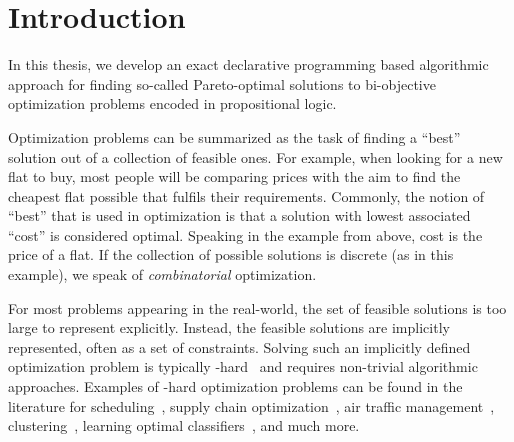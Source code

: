 \chapter{Introduction\label{chap:intro}}

In this thesis, we develop an exact declarative programming based algorithmic approach for finding so-called Pareto-optimal solutions to bi-objective optimization problems encoded in propositional logic.

Optimization problems can be summarized as the task of finding a ``best'' solution out of a collection of feasible ones.
For example, when looking for a new flat to buy, most people will be comparing prices with the aim to find the cheapest flat possible that fulfils their requirements.
Commonly, the notion of ``best'' that is used in optimization is that a solution with lowest associated ``cost'' is considered optimal.
Speaking in the example from above, cost is the price of a flat.
If the collection of possible solutions is discrete (as in this example), we speak of \emph{combinatorial} optimization.

For most problems appearing in the real-world, the set of feasible solutions is too large to represent explicitly.
Instead, the feasible solutions are implicitly represented, often as a set of constraints.
Solving such an implicitly defined optimization problem is typically \NP-hard~\autocite{AroraBarak2009-complexity} and requires non-trivial algorithmic approaches.
Examples of \NP-hard optimization problems can be found in the literature for scheduling~\autocites{DBLP:conf/cp/Stojadinovic14,DBLP:conf/cpaior/BofillGSV15,DBLP:journals/ior/Solomon87,DBLP:journals/candie/AkyolB07}, supply chain optimization~\autocite{DBLP:journals/cce/Papageorgiou09}, air traffic management~\autocites{DBLP:journals/ior/BertsimasLO11,RichardsHow2002Aircrafttrajectoryplanning}, clustering~\autocite{DBLP:journals/ai/DaoDV17,DBLP:conf/sdm/DavidsonRS10}, learning optimal classifiers~\autocites{DBLP:conf/cp/MaliotovM18,DBLP:conf/ijcai/NarodytskaIPM18,DBLP:conf/ijcai/Hu0HH20,DBLP:conf/cp/YuISB20,DBLP:conf/aaai/DemirovicS21,DBLP:conf/cp/ShatiCM21,DBLP:conf/cade/IgnatievPNM18}, and much more.


